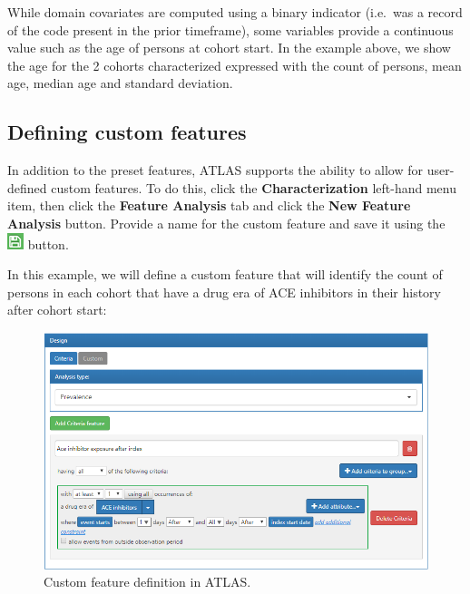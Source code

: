 \documentclass[11pt]{book}
\theoremstyle{definition}
\theoremstyle{definition}
\theoremstyle{definition}
\theoremstyle{remark}
\begin{document}
While domain covariates are computed using a binary indicator (i.e.~was a record of the code present in the prior timeframe), some variables provide a continuous value such as the age of persons at cohort start. In the example above, we show the age for the 2 cohorts characterized expressed with the count of persons, mean age, median age and standard deviation.

\hypertarget{defining-custom-features}{%
\subsection{Defining custom features}\label{defining-custom-features}}

In addition to the preset features, ATLAS supports the ability to allow for user-defined custom features. To do this, click the \textbf{Characterization} left-hand menu item, then click the \textbf{Feature Analysis} tab and click the \textbf{New Feature Analysis} button. Provide a name for the custom feature and save it using the \includegraphics{images/PopulationLevelEstimation/save.png} button. 

In this example, we will define a custom feature that will identify the count of persons in each cohort that have a drug era of ACE inhibitors in their history after cohort start:

\begin{figure}

{\centering \includegraphics[width=1\linewidth]{images/Characterization/atlasCharacterizationCustomFeature} 

}

\caption{Custom feature definition in ATLAS.}\label{fig:atlasCharacterizationCustomFeature}
\end{figure}
\end{document}

